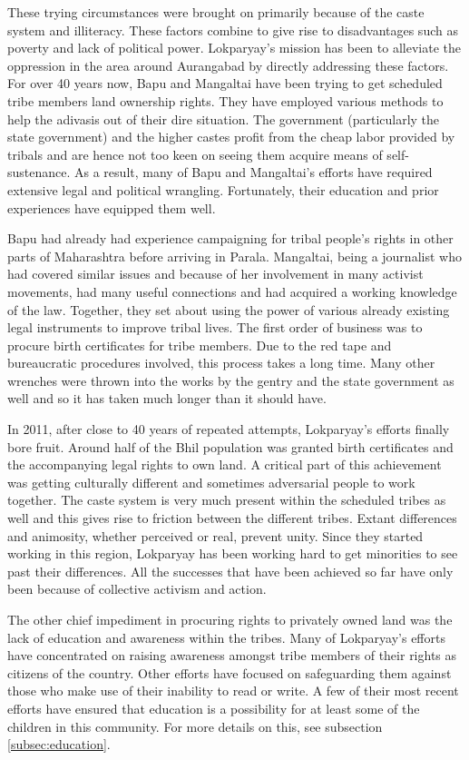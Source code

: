 \documentclass[report.tex]{subfiles}
\begin{document}
These trying circumstances were brought on primarily because of the caste system and illiteracy. These factors combine to give rise to disadvantages such as poverty and lack of political power. Lokparyay's mission has been to alleviate the oppression in the area around Aurangabad by directly addressing these factors. For over 40 years now, Bapu and Mangaltai have been trying to get scheduled tribe members land ownership rights. They have employed various methods to help the adivasis out of their dire situation. The government (particularly the state government) and the higher castes profit from the cheap labor provided by tribals and are hence not too keen on seeing them acquire means of self-sustenance. As a result, many of Bapu and Mangaltai's efforts have required extensive legal and political wrangling. Fortunately, their education and prior experiences have equipped them well.

Bapu had already had experience campaigning for tribal people's rights in other parts of Maharashtra before arriving in Parala. Mangaltai, being a journalist who had covered similar issues and because of her involvement in many activist movements, had many useful connections and had acquired a working knowledge of the law. Together, they set about using the power of various already existing legal instruments to improve tribal lives. The first order of business was to procure birth certificates for tribe members. Due to the red tape and bureaucratic procedures involved, this process takes a long time. Many other wrenches were thrown into the works by the gentry and the state government as well and so it has taken much longer than it should have.

In 2011, after close to 40 years of repeated attempts, Lokparyay's efforts finally bore fruit. Around half of the Bhil population was granted birth certificates and the accompanying legal rights to own land. A critical part of this achievement was getting culturally different and sometimes adversarial people to work together. The caste system is very much present within the scheduled tribes as well and this gives rise to friction between the different tribes. Extant differences and animosity, whether perceived or real, prevent unity. Since they started working in this region, Lokparyay has been working hard to get minorities to see past their differences. All the successes that have been achieved so far have only been because of collective activism and action.

The other chief impediment in procuring rights to privately owned land was the lack of education and awareness within the tribes. Many of Lokparyay's efforts have concentrated on raising awareness amongst tribe members of their rights as citizens of the country. Other efforts have focused on safeguarding them against those who make use of their inability to read or write. A few of their most recent efforts have ensured that education is a possibility for at least some of the children in this community. For more details on this, see subsection \ref{subsec:education}.
\end{document}
